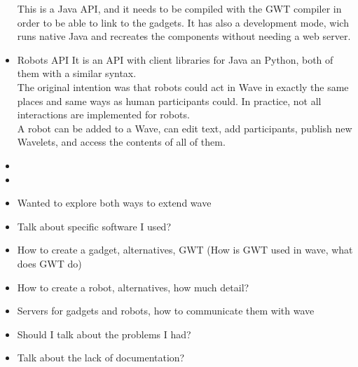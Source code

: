 \begin{itemize}
This is a Java API, and it needs to be compiled with the GWT compiler in order to be able to link to the gadgets. It has also a development mode, wich runs native Java and recreates the components without needing a web server.

  \item Robots API
  It is an API with client libraries for Java an Python, both of them with a similar syntax.\\
  The original intention was that robots could act in Wave in exactly the same places and same ways as human participants could. In practice, not all interactions are implemented for robots.\\
  A robot can be added to a Wave, can edit text, add participants, publish new Wavelets, and access the contents of all of them.
\end {itemize}

\begin{itemize}
\item {}
\item {}
  \item Wanted to explore both ways to extend wave
  \item Talk about specific software I used?
  \item How to create a gadget, alternatives, GWT (How is GWT used in wave, what does GWT do)
  \item How to create a robot, alternatives, how much detail?
  \item Servers for gadgets and robots, how to communicate them with wave
  \item Should I talk about the problems I had?
  \item Talk about the lack of documentation?
\end{itemize}
